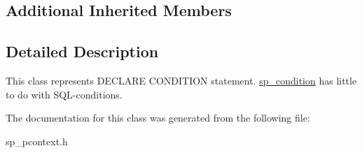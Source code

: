 \subsection*{Additional Inherited Members}


\subsection{Detailed Description}
This class represents \textquotesingle{}D\+E\+C\+L\+A\+RE C\+O\+N\+D\+I\+T\+I\+ON\textquotesingle{} statement. \mbox{\hyperlink{classsp__condition}{sp\+\_\+condition}} has little to do with S\+QL-\/conditions. 

The documentation for this class was generated from the following file\+:\begin{DoxyCompactItemize}
\item 
sp\+\_\+pcontext.\+h\end{DoxyCompactItemize}
